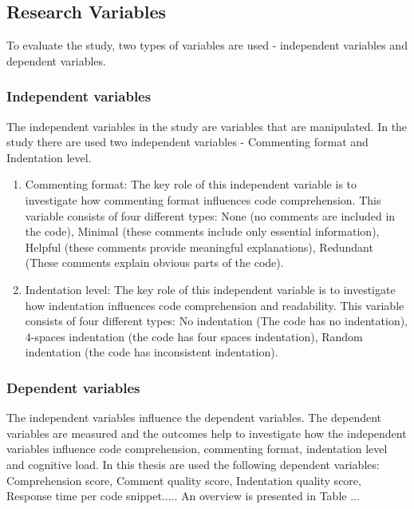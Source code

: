 \subsection{Research Variables}
To evaluate the study, two types of variables are used - independent variables and dependent variables.

\subsubsection{Independent variables}

The independent variables in the study are variables that are manipulated. In the study there are used two independent variables - Commenting format and Indentation level.

\begin{enumerate}
     \item Commenting format: The key role of this independent variable is to investigate how commenting format influences code comprehension. This variable consists of four different types: None (no comments are included in the code), Minimal (these comments include only essential information), Helpful (these comments provide meaningful explanations), Redundant (These comments explain obvious parts of the code). 

    \item Indentation level: The key role of this independent variable is to investigate how indentation influences code comprehension and readability. This variable consists of four different types: No indentation (The code has no indentation), 4-spaces indentation (the code has four spaces indentation), Random indentation (the code has inconsistent indentation). 
\end{enumerate}

\subsubsection{Dependent variables}

The independent variables influence the dependent variables. The dependent variables are measured and the outcomes help to investigate how the independent variables influence code comprehension, commenting format, indentation level and cognitive load.  In this thesis are used the following dependent variables: Comprehension score, Comment quality score, Indentation quality score, Response time per code snippet..... An overview is
presented in Table ... 


